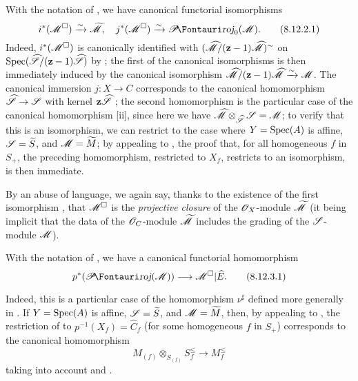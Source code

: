\begin{proposition}[8.12.2]
\label{II.8.12.2}
With the notation of , we have canonical functorial isomorphisms
\[
\label{II.8.12.2.1}
    i^*(\sh{M}^\square)\xrightarrow{\sim}\widetilde{\sh{M}},
    \quad
    j^*(\sh{M}^\square)\xrightarrow{\sim}\shProj_0(\sh{M}).
\tag{8.12.2.1}
\]
Indeed, $i^*(\mathscr{M}^\square)$ is canonically identified with $(\widehat{\mathscr{M}}/(\mathbf{z}-1)\widehat{\mathscr{M}})^\sim$ on $\operatorname{Spec}(\widehat{\mathscr{S}}/(\mathbf{z}-1)\widehat{\mathscr{S}})$ by ;
the first of the canonical isomorphisms  is then immediately induced  by the canonical isomorphism $\widehat{\mathscr{M}}/(\mathbf{z}-1)\widehat{\mathscr{M}}\xrightarrow{\sim}\mathscr{M}$.
The canonical immersion $j:X\to C$ corresponds to the canonical homomorphism $\widehat{\sh{S}}\to\sh{S}$ with kernel $\mathbf{z}\widehat{\mathscr{S}}$ ;
the second homomorphism  is the particular case of the canonical homomorphism [ii], since here we have $\widehat{\mathscr{M}}\otimes_{\widehat{\mathscr{S}}}\mathscr{S}=\mathscr{M}$;
to verify that this is an isomorphism, we can restrict to the case where $Y=\operatorname{Spec}(A)$ is affine, $\mathscr{S}=\widetilde{S}$, and $\mathscr{M}=\widetilde{M}$;
by appealing to , the proof that, for all homogeneous $f$ in $S_+$, the preceding homomorphism, restricted to $X_f$, restricts to an isomorphism, is then immediate.
\end{proposition}


By an abuse of language, we again say, thanks to the existence of the first isomorphism , that $\mathscr{M}^\square$ is the \emph{projective closure} of the $\mathscr{O}_X$-module $\widetilde{\mathscr{M}}$ (it being implicit that the data of the $\mathscr{O}_C$-module $\widetilde{\mathscr{M}}$ includes the grading of the $\mathscr{S}$-module $\mathscr{M}$).

\begin{env}[8.12.3]
\label{II.8.12.3}
With the notation of , we have a canonical functorial homomorphism
\[
\label{II.8.12.3.1}
    p^*(\shProj(\sh{M}))\to\sh{M}^\square|\widehat{E}.
\tag{8.12.3.1}
\]

Indeed, this is a particular case of the homomorphism $\nu^\sharp$ defined more generally in .
If $Y=\operatorname{Spec}(A)$ is affine, $\mathscr{S}=\widetilde{S}$, and $\mathscr{M}=\widetilde{M}$, then, by appealing to , the restriction of  to $p^{-1}(X_f)=\widehat{C}_f$ (for some homogeneous $f$ in $S_+$) corresponds to the canonical homomorphism
\[
\label{II.8.12.3.2}
    M_{(f)}\otimes_{S_{(f)}}S_f^\leq \to M_f^\leq
\tag{8.12.3.2}
\]
taking into account  and .
\end{env}

